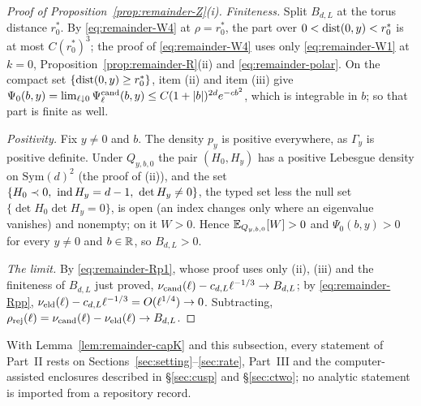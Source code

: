 \begin{proof}[Proof of Proposition~\ref{prop:remainder-Z}(i)]
\emph{Finiteness.} Split $B_{d,L}$ at the torus distance $r_0^*$. By \eqref{eq:remainder-W4} at $\rho=r_0^*$, the part over $0<\operatorname{dist}(0,y)<r_0^*$ is at most $C(r_0^*)^3$; the proof of \eqref{eq:remainder-W4} uses only \eqref{eq:remainder-W1} at $k=0$, Proposition~\ref{prop:remainder-R}(ii) and \eqref{eq:remainder-polar}. On the compact set $\{\operatorname{dist}(0,y)\ge r_0^*\}$, item (ii) and item (iii) give $\Psi_0(b,y)=\lim_{\ell\downarrow0}\Psi^{\mathrm{cand}}_\ell(b,y)\le C(1+|b|)^{2d}e^{-cb^2}$, which is integrable in $b$; so that part is finite as well.

\emph{Positivity.} Fix $y\ne0$ and $b$. The density $p_y$ is positive everywhere, as $\Gamma_y$ is positive definite. Under $Q_{y,b,0}$ the pair $(H_0,H_y)$ has a positive Lebesgue density on $\mathrm{Sym}(d)^2$ (the proof of (ii)), and the set $\{H_0\prec0,\ \operatorname{ind} H_y=d-1,\ \det H_y\ne0\}$, the typed set less the null set $\{\det H_0\det H_y=0\}$, is open (an index changes only where an eigenvalue vanishes) and nonempty; on it $W>0$. Hence $\mathbb E_{Q_{y,b,0}}[W]>0$ and $\Psi_0(b,y)>0$ for every $y\ne0$ and $b\in\mathbb R$, so $B_{d,L}>0$.

\emph{The limit.} By \eqref{eq:remainder-Rp1}, whose proof uses only (ii), (iii) and the finiteness of $B_{d,L}$ just proved, $\nu_{\mathrm{cand}}(\ell)-c_{d,L}\ell^{-1/3}\to B_{d,L}$; by \eqref{eq:remainder-Rpp}, $\nu_{\mathrm{eld}}(\ell)-c_{d,L}\ell^{-1/3}=O(\ell^{1/4})\to0$. Subtracting, $\rho_{\mathrm{rej}}(\ell)=\nu_{\mathrm{cand}}(\ell)-\nu_{\mathrm{eld}}(\ell)\to B_{d,L}$.
\end{proof}

With Lemma~\ref{lem:remainder-capK} and this subsection, every statement of Part~II rests on Sections~\ref{sec:setting}--\ref{sec:rate}, Part~III and the computer-assisted enclosures described in \S\ref{sec:cusp} and \S\ref{sec:ctwo}; no analytic statement is imported from a repository record.

